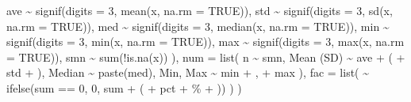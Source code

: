\documentclass[
]{article}
\newenvironment{Shaded}{\begin{snugshade}}{\end{snugshade}}
\newcommand{\AttributeTok}[1]{\textcolor[rgb]{0.77,0.63,0.00}{#1}}
\newcommand{\ConstantTok}[1]{\textcolor[rgb]{0.00,0.00,0.00}{#1}}
\newcommand{\DecValTok}[1]{\textcolor[rgb]{0.00,0.00,0.81}{#1}}
\newcommand{\FunctionTok}[1]{\textcolor[rgb]{0.00,0.00,0.00}{#1}}
\newcommand{\NormalTok}[1]{#1}
\newcommand{\SpecialCharTok}[1]{\textcolor[rgb]{0.00,0.00,0.00}{#1}}
\newcommand{\StringTok}[1]{\textcolor[rgb]{0.31,0.60,0.02}{#1}}
\begin{document}
\begin{Shaded}
\begin{Highlighting}[]
\NormalTok{      ave }\SpecialCharTok{\textasciitilde{}} \FunctionTok{signif}\NormalTok{(}\AttributeTok{digits =} \DecValTok{3}\NormalTok{,    }\FunctionTok{mean}\NormalTok{(x,  }\AttributeTok{na.rm =} \ConstantTok{TRUE}\NormalTok{)),}
\NormalTok{      std }\SpecialCharTok{\textasciitilde{}} \FunctionTok{signif}\NormalTok{(}\AttributeTok{digits =} \DecValTok{3}\NormalTok{,      }\FunctionTok{sd}\NormalTok{(x,  }\AttributeTok{na.rm =} \ConstantTok{TRUE}\NormalTok{)),}
\NormalTok{      med }\SpecialCharTok{\textasciitilde{}} \FunctionTok{signif}\NormalTok{(}\AttributeTok{digits =} \DecValTok{3}\NormalTok{,  }\FunctionTok{median}\NormalTok{(x,  }\AttributeTok{na.rm =} \ConstantTok{TRUE}\NormalTok{)),}
\NormalTok{      min }\SpecialCharTok{\textasciitilde{}} \FunctionTok{signif}\NormalTok{(}\AttributeTok{digits =} \DecValTok{3}\NormalTok{,     }\FunctionTok{min}\NormalTok{(x,  }\AttributeTok{na.rm =} \ConstantTok{TRUE}\NormalTok{)),}
\NormalTok{      max }\SpecialCharTok{\textasciitilde{}} \FunctionTok{signif}\NormalTok{(}\AttributeTok{digits =} \DecValTok{3}\NormalTok{,     }\FunctionTok{max}\NormalTok{(x,  }\AttributeTok{na.rm =} \ConstantTok{TRUE}\NormalTok{)),}
\NormalTok{      smn }\SpecialCharTok{\textasciitilde{}} \FunctionTok{sum}\NormalTok{(}\SpecialCharTok{!}\FunctionTok{is.na}\NormalTok{(x))}
\NormalTok{    ),}
    \AttributeTok{num =} \FunctionTok{list}\NormalTok{(}
\NormalTok{      n }\SpecialCharTok{\textasciitilde{}}\NormalTok{ smn,}
      \StringTok{\textasciigrave{}}\AttributeTok{Mean (SD)}\StringTok{\textasciigrave{}} \SpecialCharTok{\textasciitilde{}}\NormalTok{  ave }\SpecialCharTok{+} \StringTok{\textquotesingle{} (\textquotesingle{}} \SpecialCharTok{+}\NormalTok{ std }\SpecialCharTok{+} \StringTok{\textquotesingle{})\textquotesingle{}}\NormalTok{,}
\NormalTok{      Median }\SpecialCharTok{\textasciitilde{}}  \FunctionTok{paste}\NormalTok{(med),}
      \StringTok{\textasciigrave{}}\AttributeTok{Min, Max}\StringTok{\textasciigrave{}} \SpecialCharTok{\textasciitilde{}}\NormalTok{  min }\SpecialCharTok{+} \StringTok{\textquotesingle{}, \textquotesingle{}} \SpecialCharTok{+}\NormalTok{ max}
\NormalTok{    ),}
    \AttributeTok{fac =} \FunctionTok{list}\NormalTok{(}
      \StringTok{\textasciigrave{}}\AttributeTok{ }\StringTok{\textasciigrave{}} \SpecialCharTok{\textasciitilde{}} \FunctionTok{ifelse}\NormalTok{(sum }\SpecialCharTok{==} \DecValTok{0}\NormalTok{, }\StringTok{\textquotesingle{}0\textquotesingle{}}\NormalTok{, sum }\SpecialCharTok{+} \StringTok{\textquotesingle{} (\textquotesingle{}} \SpecialCharTok{+}\NormalTok{ pct }\SpecialCharTok{+} \StringTok{\textquotesingle{}\%\textquotesingle{}} \SpecialCharTok{+} \StringTok{\textquotesingle{})\textquotesingle{}}\NormalTok{)}
\NormalTok{    )}
\NormalTok{  )}
\end{Highlighting}
\end{Shaded}
\end{document}
